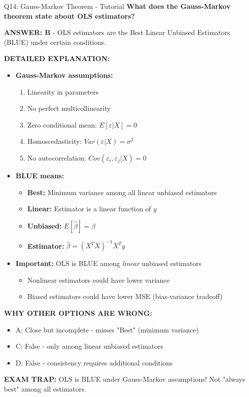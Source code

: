 \documentclass[8pt]{beamer}
\begin{document}
	\begin{frame}{Q14: Gauss-Markov Theorem - Tutorial}
		\fontsize{6.5}{7.5}\selectfont
		\textbf{What does the Gauss-Markov theorem state about OLS estimators?}
		
		\vspace{0.05cm}
		\textcolor{myblue}{\textbf{ANSWER: B}} - OLS estimators are the Best Linear Unbiased Estimators (BLUE) under certain conditions.
		
		\vspace{0.05cm}
		\textbf{DETAILED EXPLANATION:}
		\begin{itemize}
			\item \textbf{Gauss-Markov assumptions:}
			\begin{enumerate}
				\item Linearity in parameters
				\item No perfect multicollinearity
				\item Zero conditional mean: $E[\varepsilon | X] = 0$
				\item Homoscedasticity: $Var(\varepsilon | X) = \sigma^2$
				\item No autocorrelation: $Cov(\varepsilon_i, \varepsilon_j | X) = 0$
			\end{enumerate}
			\item \textbf{BLUE means:}
			\begin{itemize}
				\item \textbf{Best:} Minimum variance among all linear unbiased estimators
				\item \textbf{Linear:} Estimator is a linear function of $y$
				\item \textbf{Unbiased:} $E[\hat{\beta}] = \beta$
				\item \textbf{Estimator:} $\hat{\beta} = (X^TX)^{-1}X^Ty$
			\end{itemize}
			\item \textbf{Important:} OLS is BLUE among \textit{linear} unbiased estimators
			\begin{itemize}
				\item Nonlinear estimators could have lower variance
				\item Biased estimators could have lower MSE (bias-variance tradeoff)
			\end{itemize}
		\end{itemize}
		
		\vspace{0.05cm}
		\textcolor{myred}{\textbf{WHY OTHER OPTIONS ARE WRONG:}}
		\begin{itemize}
			\item \textcolor{myred}{A:} Close but incomplete - misses "Best" (minimum variance)
			\item \textcolor{myred}{C:} False - only among linear unbiased estimators
			\item \textcolor{myred}{D:} False - consistency requires additional conditions
		\end{itemize}
		
		\textcolor{myred}{\textbf{EXAM TRAP:}} OLS is \textcolor{myblue}{BLUE} under Gauss-Markov assumptions! Not "always best" among all estimators.
	\end{frame}
	
\end{document}
